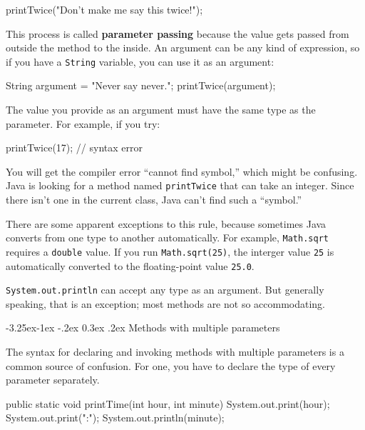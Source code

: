 \documentclass[12pt]{book}
\makeatletter
\renewcommand\subsection{\@startsection{subsection}{2}{\z@}%
    {-3.25ex\@plus -1ex \@minus -.2ex}%
    {0.3ex \@plus .2ex}%
    {\normalfont\large\bfseries}}
\theoremstyle{exercise}
\newcommand{\java}[1]{\lstinline{#1}} %
\makeatother
\begin{document}
\begin{code}
    printTwice("Don't make me say this twice!");
\end{code}


This process is called {\bf parameter passing} because the value gets passed from outside the method to the inside.
An argument can be any kind of expression, so if you have a \java{String} variable, you can use it as an argument:

\begin{code}
    String argument = "Never say never.";
    printTwice(argument);
\end{code}

The value you provide as an argument must have the same type as the parameter.
For example, if you try:

\begin{code}
    printTwice(17);  // syntax error
\end{code}

You will get the compiler error ``cannot find symbol,'' which might be confusing.
Java is looking for a method named \java{printTwice} that can take an integer.
Since there isn't one in the current class, Java can't find such a ``symbol.''

There are some apparent exceptions to this rule, because sometimes Java converts from one type to another automatically.
For example, \java{Math.sqrt} requires a \java{double} value.
If you run \java{Math.sqrt(25)}, the interger value \java{25} is automatically converted to the floating-point value \java{25.0}.

\java{System.out.println} can accept any type as an argument.
But generally speaking, that is an exception; most methods are not so accommodating.

\subsection{Methods with multiple parameters}
\label{time}


The syntax for declaring and invoking methods with multiple parameters is a common source of confusion.
For one, you have to declare the type of every parameter separately.

\begin{code}
    public static void printTime(int hour, int minute) {
        System.out.print(hour);
        System.out.print(":");
        System.out.println(minute);
    }
\end{code}
\end{document}
